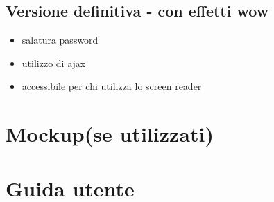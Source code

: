 \documentclass[a4paper,12pt]{report}
\begin{document}
	\subsection{Versione definitiva - con effetti wow}
	\begin{itemize}
		\item salatura password
		\item utilizzo di ajax
		\item accessibile per chi utilizza lo screen reader
	\end{itemize}
	\section{Mockup(se utilizzati)}
	\section{Guida utente}
\end{document}
